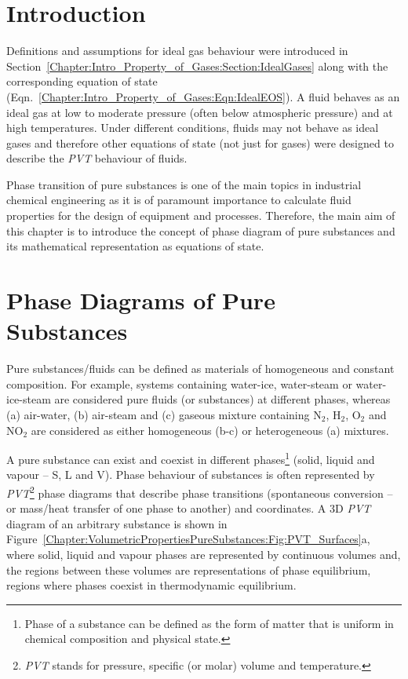    \section{Introduction}\label{Chapter:VolumetricPropertiesPureSubstances:Section:Intro}
   Definitions and assumptions for ideal gas behaviour were introduced in Section~\ref{Chapter:Intro_Property_of_Gases:Section:IdealGases} along with the corresponding equation of state (Eqn.~\ref{Chapter:Intro_Property_of_Gases:Eqn:IdealEOS}). A fluid behaves as an ideal gas at low to moderate pressure (often below atmospheric pressure) and at high temperatures. Under different conditions, fluids may not behave as ideal gases and therefore other equations of state (not just for gases) were designed to describe the {\it PVT} behaviour of fluids.

Phase transition of pure substances is one of the main topics in industrial chemical engineering as it is of paramount importance to calculate fluid properties for the design of equipment and processes. Therefore, the main aim of this chapter is to introduce the concept of phase diagram of pure substances and its mathematical representation as equations of state. 

  
   \section{Phase Diagrams of Pure Substances}\label{Chapter:VolumetricPropertiesPureSubstances:Section:PhaseDiagrams}

Pure substances/fluids can be defined as materials of homogeneous and constant composition. For example, systems containing water-ice, water-steam or water-ice-steam are considered pure fluids (or substances) at different phases, whereas (a) air-water, (b) air-steam and (c) gaseous mixture containing N$_{2}$, H$_{2}$, O$_{2}$ and NO$_{2}$ are considered as either homogeneous (b-c) or heterogeneous (a) mixtures.

A pure substance can exist and coexist in different phases\footnote{Phase of a substance can be defined as the form of matter that is uniform in chemical composition and physical state.}  (\ie solid, liquid and vapour -- S, L and V). Phase behaviour of substances is often represented by {\it PVT}\footnote{{\it PVT} stands for pressure, specific (or molar) volume and temperature.} phase diagrams that describe phase transitions (\ie spontaneous conversion -- or mass/heat transfer of one phase to another) and coordinates. A 3D {\it PVT} diagram of an arbitrary substance is shown in Figure~\ref{Chapter:VolumetricPropertiesPureSubstances:Fig:PVT_Surfaces}a, where solid, liquid and vapour phases are represented by continuous volumes and, the regions between these volumes are representations of phase equilibrium, \ie regions where phases coexist in thermodynamic equilibrium.

